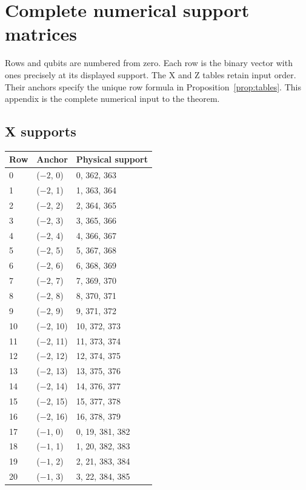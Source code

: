\documentclass{article}
\begin{document}
\appendix
\section{Complete numerical support matrices}\label{app:tables}

Rows and qubits are numbered from zero. Each row is the binary vector with ones precisely at its
displayed support. The X and Z tables retain input order. Their anchors specify the unique row
formula in Proposition~\ref{prop:tables}. This appendix is the complete numerical input to the
theorem.

\subsection{X supports}\label{sec:x-supports}

\begin{longtable}{lll}
  Row & Anchor & Physical support \\
  \hline
  \endhead
  0 & (\(-2\), 0) & 0, 362, 363 \\
  1 & (\(-2\), 1) & 1, 363, 364 \\
  2 & (\(-2\), 2) & 2, 364, 365 \\
  3 & (\(-2\), 3) & 3, 365, 366 \\
  4 & (\(-2\), 4) & 4, 366, 367 \\
  5 & (\(-2\), 5) & 5, 367, 368 \\
  6 & (\(-2\), 6) & 6, 368, 369 \\
  7 & (\(-2\), 7) & 7, 369, 370 \\
  8 & (\(-2\), 8) & 8, 370, 371 \\
  9 & (\(-2\), 9) & 9, 371, 372 \\
  10 & (\(-2\), 10) & 10, 372, 373 \\
  11 & (\(-2\), 11) & 11, 373, 374 \\
  12 & (\(-2\), 12) & 12, 374, 375 \\
  13 & (\(-2\), 13) & 13, 375, 376 \\
  14 & (\(-2\), 14) & 14, 376, 377 \\
  15 & (\(-2\), 15) & 15, 377, 378 \\
  16 & (\(-2\), 16) & 16, 378, 379 \\
  17 & (\(-1\), 0) & 0, 19, 381, 382 \\
  18 & (\(-1\), 1) & 1, 20, 382, 383 \\
  19 & (\(-1\), 2) & 2, 21, 383, 384 \\
  20 & (\(-1\), 3) & 3, 22, 384, 385 \\

\end{longtable}
\end{document}
